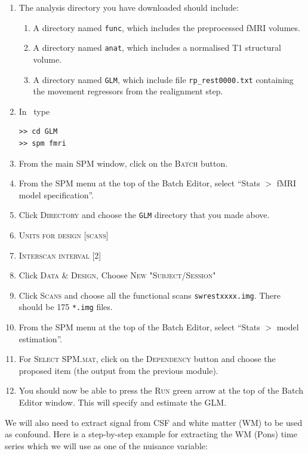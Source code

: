 \begin{enumerate}
 \item The analysis directory you have downloaded should include:
 \begin{enumerate}
  \item A directory named \texttt{func}, which includes the preprocessed fMRI volumes.
  \item A directory named \texttt{anat}, which includes a normalised T1 structural volume.
  \item A directory named \texttt{GLM}, which include file \texttt{rp\_rest0000.txt} containing the movement regressors from the realignment step.
 \end{enumerate}
 \item In \matlab\ type
\begin{verbatim}
>> cd GLM
>> spm fmri
\end{verbatim}
 \item From the main SPM window, click on the \textsc{Batch} button.
 \item From the SPM menu at the top of the Batch Editor, select ``Stats $>$ fMRI model specification''.
 \item Click \textsc{Directory} and choose the \texttt{GLM} directory that you made above.
 \item \textsc{Units for design} [\textsc{scans}]
 \item \textsc{Interscan interval} [2]
 \item Click \textsc{Data \& Design}, Choose \textsc{New "Subject/Session"}
 \item Click \textsc{Scans} and choose all the functional scans \texttt{swrestxxxx.img}. There should be 175 \texttt{*.img} files.
 \item From the SPM menu at the top of the Batch Editor, select ``Stats $>$ model estimation''.
 \item For \textsc{Select SPM.mat}, click on the \textsc{Dependency} button and choose the proposed item (the output from the previous module).
 \item You should now be able to press the \textsc{Run} green arrow at the top of the Batch Editor window. This will specify and estimate the GLM.
\end{enumerate}

We will also need to extract signal from CSF and white matter (WM) to be used as confound. Here is a step-by-step example for extracting the WM (Pons) time series which we will use as one of the nuisance variable:

